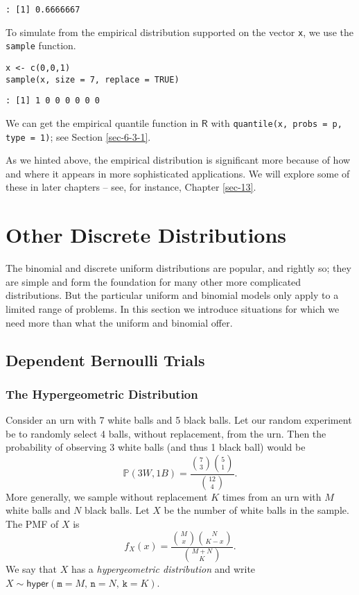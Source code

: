\begin{verbatim}
: [1] 0.6666667
\end{verbatim}

To simulate from the empirical distribution supported on the vector
\texttt{x}, we use the \texttt{sample}  function.

\begin{verbatim}
x <- c(0,0,1)
sample(x, size = 7, replace = TRUE)
\end{verbatim}

\begin{verbatim}
: [1] 1 0 0 0 0 0 0
\end{verbatim}

We can get the empirical quantile function in \(\mathsf{R}\) with
\texttt{quantile(x, probs = p, type = 1)}; see Section \ref{sec-6-3-1}.

As we hinted above, the empirical distribution is significant more
because of how and where it appears in more sophisticated
applications. We will explore some of these in later chapters -- see,
for instance, Chapter \ref{sec-13}.

\section{Other Discrete Distributions}
\label{sec-5-6}

The binomial and discrete uniform distributions are popular, and
rightly so; they are simple and form the foundation for many other
more complicated distributions. But the particular uniform and
binomial models only apply to a limited range of problems. In this
section we introduce situations for which we need more than what the
uniform and binomial offer.

\subsection{Dependent Bernoulli Trials}
\label{sec-5-6-1}

\subsubsection{The Hypergeometric Distribution}
\label{sec-5-6-1-1}

Consider an urn with 7 white balls and 5 black balls. Let our random
experiment be to randomly select 4 balls, without replacement, from
the urn. Then the probability of observing 3 white balls (and thus 1
black ball) would be
\begin{equation}
\mathbb{P}(3W,1B)=\frac{{7 \choose 3}{5 \choose 1}}{{12 \choose 4}}.
\end{equation}
More generally, we sample without replacement \(K\) times from an urn
with \(M\) white balls and \(N\) black balls. Let \(X\) be the number
of white balls in the sample. The PMF of \(X\) is
\begin{equation}
f_{X}(x)=\frac{{M \choose x}{N \choose K-x}}{{M+N \choose K}}.
\end{equation}
We say that \(X\) has a \emph{hypergeometric distribution} and write
\(X\sim\mathsf{hyper}(\mathtt{m}=M,\,\mathtt{n}=N,\,\mathtt{k}=K)\).

